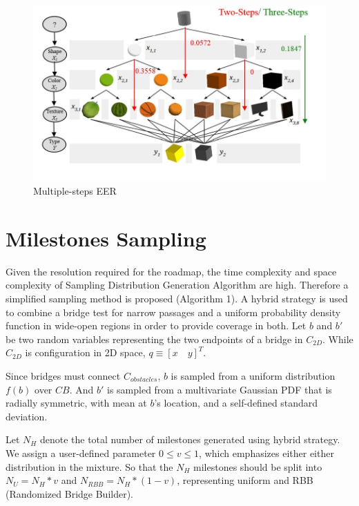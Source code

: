 \documentclass[12pt,draftcls,onecolumn]{IEEEtran}
\begin{document}
\begin{figure}
 \centering
  \includegraphics[width=15cm]{figures/someStepEER}
  \caption{Multiple-steps EER}
  \label{fig:14}
\end{figure}


\clearpage
\section{Milestones Sampling}
 Given the resolution required for the roadmap, the  time complexity and space complexity of Sampling Distribution Generation Algorithm are high.
Therefore a simplified sampling method is proposed (Algorithm 1).
A hybrid strategy is used to combine a bridge test for narrow passages and a uniform probability density function in wide-open regions in order to provide coverage in both.
Let $b$ and $b'$ be two random variables representing the two endpoints of a bridge in $C_{2D}$.
While $C_{2D}$ is configuration in 2D space,  $q \equiv [x  \quad  y  ]^T$.

Since bridges must connect $C_{obstacles}$, $b$ is sampled from a uniform distribution $f(b)$ over $CB$.
And $b'$ is sampled from a multivariate Gaussian PDF that is radially symmetric, with mean at $b$'s location, and a self-defined standard deviation.



Let $N_{H}$ denote the total number of milestones generated using hybrid strategy.
We assign a user-defined parameter $0\leq v \leq 1$, which emphasizes either either distribution in the mixture.
So that the $N_{H}$  milestones should be split into  $N_{U} =N_{H}*v $ and $N_{RBB} =N_{H}*(1-v) $, representing uniform and RBB (Randomized Bridge Builder).
\end{document}
